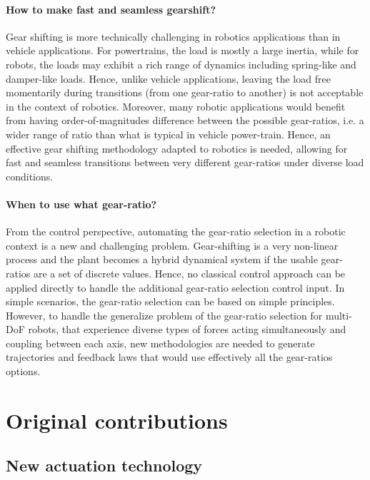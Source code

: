 \paragraph{How to make fast and seamless gearshift?}
Gear shifting is more technically challenging in robotics applications than in vehicle applications. For powertrains, the load is mostly a large inertia, while for robots, the loads may exhibit a rich range of dynamics including spring-like and damper-like loads. Hence, unlike vehicle applications, leaving the load free momentarily during transitions (from one gear-ratio to another) is not acceptable in the context of robotics. Moreover, many robotic applications would benefit from having order-of-magnitudes difference between the possible gear-ratios, i.e. a wider range of ratio than what is typical in vehicle power-train. Hence, an effective gear shifting methodology adapted to robotics is needed, allowing for fast and seamless transitions between very different gear-ratios under diverse load conditions.

\paragraph{When to use what gear-ratio?}
From the control perspective, automating the gear-ratio selection in a robotic context is a new and challenging problem. Gear-shifting is a very non-linear process and the plant becomes a hybrid dynamical system if the usable gear-ratios are a set of discrete values. Hence, no classical control approach can be applied directly to handle the additional gear-ratio selection control input. In simple scenarios, the gear-ratio selection can be based on simple principles. However, to handle the generalize problem of the gear-ratio selection for multi-DoF robots, that experience diverse types of forces acting simultaneously and coupling between each axis, new methodologies are needed to generate trajectories and feedback laws that would use effectively all the gear-ratios options.



\section{Original contributions}
\label{sec:contribution}

\subsection{New actuation technology}

